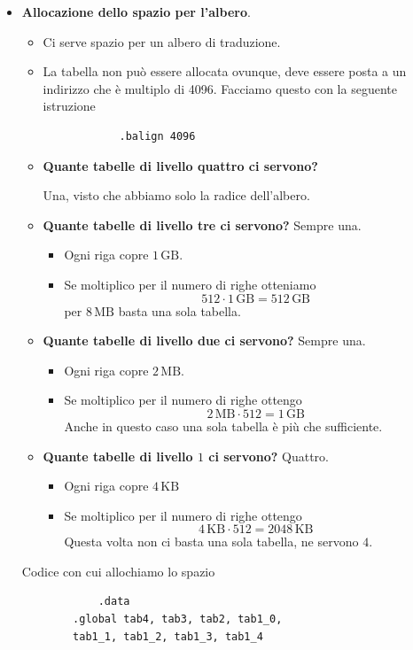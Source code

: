 \documentclass[11pt]{report}
\theoremstyle{definition}
\begin{document}
\begin{itemize}
	\item \textbf{Allocazione dello spazio per l'albero}.
	\begin{itemize}
		\item Ci serve spazio per un albero di traduzione.
		\item La tabella non può essere allocata ovunque, deve essere posta a un indirizzo che è multiplo di 4096. Facciamo questo con la seguente istruzione
		\begin{verbatim}
			.balign 4096
		\end{verbatim}
		\item \textbf{Quante tabelle di livello quattro ci servono?} 
		
		Una, visto che abbiamo solo la radice dell'albero.
		\item \textbf{Quante tabelle di livello tre ci servono?} Sempre una. 
		\begin{itemize}
			\item Ogni riga copre $1\,\text{GB}$.
			\item Se moltiplico per il numero di righe otteniamo
			\[512 \cdot 1\,\text{GB} = 512\,\text{GB}\]
			per $8\,\text{MB}$ basta una sola tabella.
		\end{itemize}
		\item \textbf{Quante tabelle di livello due ci servono?} Sempre una. 
		\begin{itemize}
			\item Ogni riga copre $2\,\text{MB}$.
			\item Se moltiplico per il numero di righe ottengo
			\[2\,\text{MB} \cdot 512 = 1\,\text{GB}\]
			Anche in questo caso una sola tabella è più che sufficiente.
		\end{itemize}
		\item \textbf{Quante tabelle di livello $1$ ci servono?} Quattro.
		\begin{itemize}
			\item Ogni riga copre $4\,\text{KB}$
			\item Se moltiplico per il numero di righe ottengo
			\[4\,\text{KB} \cdot 512 = 2048\,\text{KB} \]
			Questa volta non ci basta una sola tabella, ne servono $4$.
		\end{itemize}
	\end{itemize}
	Codice con cui allochiamo lo spazio 
	\begin{multicols}{2}
	\begin{verbatim}
			.data
		.global tab4, tab3, tab2, tab1_0, 
		tab1_1, tab1_2, tab1_3, tab1_4

\end{verbatim}
\end{multicols}
\end{itemize}
\end{document}
